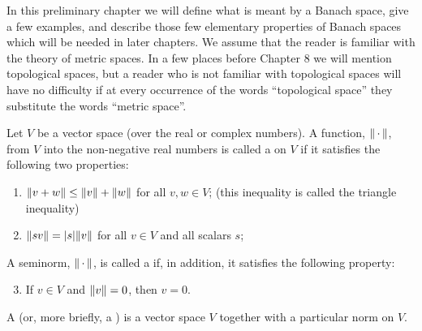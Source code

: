 
In this preliminary chapter we will define what is meant by a Banach space, give a few examples, and describe those few elementary properties of Banach spaces which will be needed in later chapters. We assume that the reader is familiar with the theory of metric spaces. In a few places before Chapter 8 we will mention topological spaces, but a reader who is not familiar with topological spaces will have no difficulty if at every occurrence of the words ``topological space'' they substitute the words ``metric space''.

\begin{definition}\label{def:norm}
Let $V$ be a vector space (over the real or complex numbers). A function, $\norm{\,\cdot\,}$, from $V$ into the non-negative real numbers is called a  on $V$ if it satisfies the following two properties:
\begin{enumerate}
    \item $\norm{v+w}\leq\norm{v}+\norm{w}$ for all $v,w\in V$; (this inequality is called the triangle inequality)
    \item $\norm{sv}=|s|\norm{v}$ for all $v\in V$ and all scalars $s$;
\end{enumerate}
A seminorm, $\norm{\,\cdot\,}$, is called a  if, in addition, it satisfies the following property:
\begin{enumerate}
    \setcounter{enumi}{2}
    \item If $v\in V$ and $\norm{v}=0$, then $v=0$.
\end{enumerate}
\end{definition}

\begin{definition}\label{def:norm space}
A  (or, more briefly, a ) is a vector space $V$ together with a particular norm on $V$.
\end{definition}



